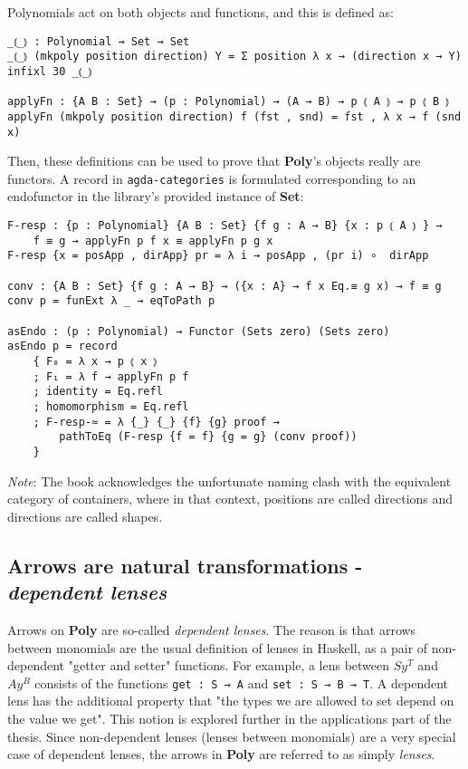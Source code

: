 Polynomials act on both objects and functions, and this is defined as:
\begin{verbatim}
_⦅_⦆ : Polynomial → Set → Set
_⦅_⦆ (mkpoly position direction) Y = Σ position λ x → (direction x → Y)
infixl 30 _⦅_⦆

applyFn : {A B : Set} → (p : Polynomial) → (A → B) → p ⦅ A ⦆ → p ⦅ B ⦆
applyFn (mkpoly position direction) f (fst , snd) = fst , λ x → f (snd x)
\end{verbatim}

Then, these definitions can be used to prove that \textbf{Poly}'s objects really are functors. 
A record in \texttt{agda-categories} is formulated corresponding to an endofunctor in the library's provided instance of \textbf{Set}:

\begin{verbatim}
F-resp : {p : Polynomial} {A B : Set} {f g : A → B} {x : p ⦅ A ⦆ } → 
    f ≡ g → applyFn p f x ≡ applyFn p g x
F-resp {x = posApp , dirApp} pr = λ i → posApp , (pr i) ∘  dirApp

conv : {A B : Set} {f g : A → B} → ({x : A} → f x Eq.≡ g x) → f ≡ g
conv p = funExt λ _ → eqToPath p

asEndo : (p : Polynomial) → Functor (Sets zero) (Sets zero)
asEndo p = record
    { F₀ = λ x → p ⦅ x ⦆
    ; F₁ = λ f → applyFn p f
    ; identity = Eq.refl
    ; homomorphism = Eq.refl
    ; F-resp-≈ = λ {_} {_} {f} {g} proof → 
        pathToEq (F-resp {f = f} {g = g} (conv proof))
    }
\end{verbatim}

\textit{Note}: The book acknowledges the unfortunate naming clash with the equivalent category of containers, where in that context, positions are called directions and directions are called shapes.

\subsection{Arrows are natural transformations - \textit{dependent lenses}}

Arrows on \textbf{Poly} are so-called \textit{dependent lenses}.
The reason is that arrows between monomials are the usual definition of lenses in Haskell, as a pair of non-dependent "getter and setter" functions. For example, a lens between $Sy^T$ and $Ay^B$ consists of the functions \texttt{get : S → A} and \texttt{set : S → B → T}. 
A dependent lens has the additional property that "the types we are allowed to set depend on the value we get".
This notion is explored further in the applications part of the thesis. 
Since non-dependent lenses (lenses between monomials) are a very special case of dependent lenses, the arrows in \textbf{Poly} are referred to as simply \textit{lenses}.

